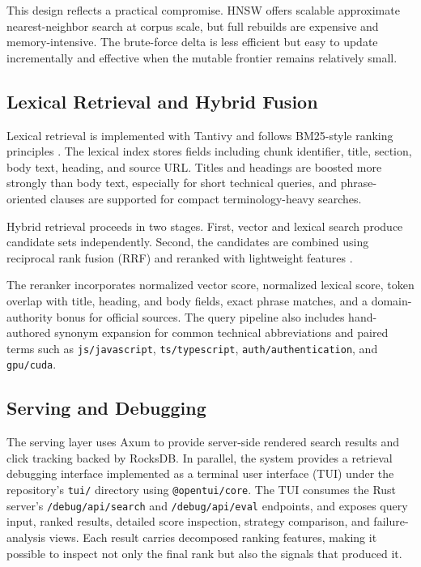 \documentclass[conference]{IEEEtran}
\begin{document}
This design reflects a practical compromise. HNSW offers scalable approximate nearest-neighbor search at corpus scale, but full rebuilds are expensive and memory-intensive. The brute-force delta is less efficient but easy to update incrementally and effective when the mutable frontier remains relatively small.

\subsection{Lexical Retrieval and Hybrid Fusion}
Lexical retrieval is implemented with Tantivy and follows BM25-style ranking principles \cite{robertson2009bm25}. The lexical index stores fields including chunk identifier, title, section, body text, heading, and source URL. Titles and headings are boosted more strongly than body text, especially for short technical queries, and phrase-oriented clauses are supported for compact terminology-heavy searches.

Hybrid retrieval proceeds in two stages. First, vector and lexical search produce candidate sets independently. Second, the candidates are combined using reciprocal rank fusion (RRF) and reranked with lightweight features \cite{cormack2009rrf}.

The reranker incorporates normalized vector score, normalized lexical score, token overlap with title, heading, and body fields, exact phrase matches, and a domain-authority bonus for official sources. The query pipeline also includes hand-authored synonym expansion for common technical abbreviations and paired terms such as \texttt{js/javascript}, \texttt{ts/typescript}, \texttt{auth/authentication}, and \texttt{gpu/cuda}.

\subsection{Serving and Debugging}
The serving layer uses Axum to provide server-side rendered search results and click tracking backed by RocksDB. In parallel, the system provides a retrieval debugging interface implemented as a terminal user interface (TUI) under the repository's \texttt{tui/} directory using \texttt{@opentui/core}. The TUI consumes the Rust server's \texttt{/debug/api/search} and \texttt{/debug/api/eval} endpoints, and exposes query input, ranked results, detailed score inspection, strategy comparison, and failure-analysis views. Each result carries decomposed ranking features, making it possible to inspect not only the final rank but also the signals that produced it.
\end{document}
